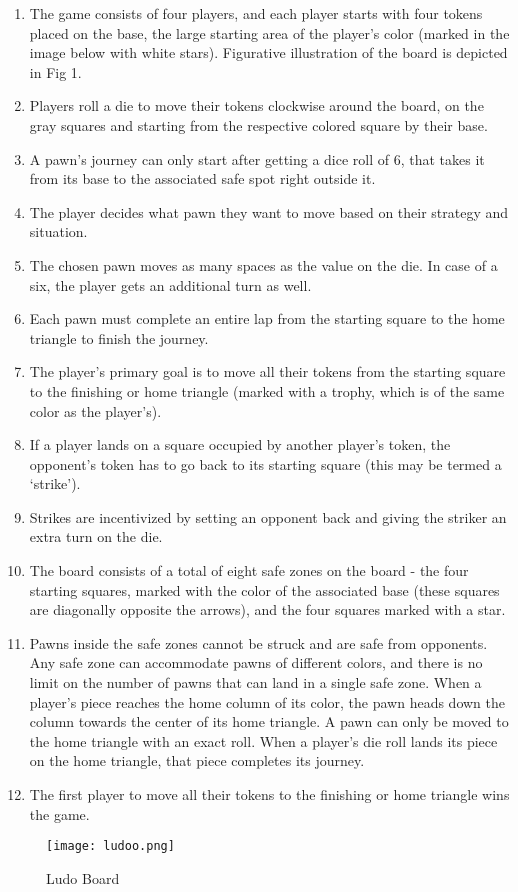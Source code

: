 \documentclass{article} %
\begin{document}
\begin{enumerate}
    \item The game consists of four players, and each player starts with four tokens placed on the base, the large starting area of the player's color (marked in the image below with white stars). Figurative illustration of the board is depicted in Fig 1. 
\item Players roll a die to move their tokens clockwise around the board, on the gray squares and starting from the respective colored square by their base.
\item A pawn’s journey can only start after getting a dice roll of 6, that takes it from its base to the associated safe spot right outside it. 
\item The player decides what pawn they want to move based on their strategy and situation.
\item The chosen pawn moves as many spaces as the value on the die. In case of a six, the player gets an additional turn as well.
\item Each pawn must complete an entire lap from the starting square to the home triangle to finish the journey.
\item The player's primary goal is to move all their tokens from the starting square to the finishing or home triangle (marked with a trophy, which is of the same color as the player’s).
\item If a player lands on a square occupied by another player's token, the opponent's token has to go back to its starting square (this may be termed a ‘strike’).
\item Strikes are incentivized by setting an opponent back and giving the striker an extra turn on the die.
\item The board consists of a total of eight safe zones on the board - the four starting squares, marked with the color of the associated base (these squares are diagonally opposite the arrows), and the four squares marked with a star.
\item Pawns inside the safe zones cannot be struck and are safe from opponents. Any safe zone can accommodate pawns of different colors, and there is no limit on the number of pawns that can land in a single safe zone.
When a player's piece reaches the home column of its color, the pawn heads down the column towards the center of its home triangle. A pawn can only be moved to the home triangle with an exact roll. When a player's die roll lands its piece on the home triangle, that piece completes its journey.
\item The first player to move all their tokens to the finishing or home triangle wins the game.

    
\end{enumerate}
\begin{figure}[h]
  \centering
  \texttt{[image: ludoo.png]}
  \caption{Ludo Board}
  \label{fig:figure_label}
\end{figure}
\end{document}
